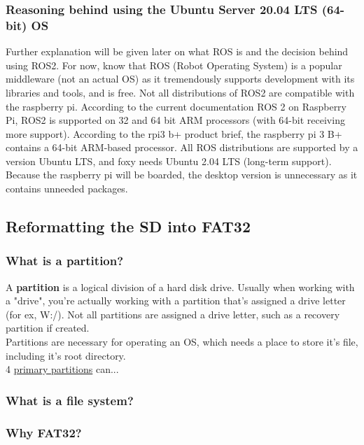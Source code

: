 \documentclass[a4paper, 10pt]{article}
\begin{document}
        \subsubsection{Reasoning behind using the Ubuntu Server 20.04 LTS (64-bit) OS}
            Further explanation will be given later on what ROS is and the decision behind using ROS2. For now, know that ROS (Robot Operating System) is a popular middleware (not an actual OS) as it tremendously supports development with its libraries and tools, and is free.
            Not all distributions of ROS2 are compatible with the raspberry pi. According to the current documentation ROS 2 on Raspberry Pi, ROS2 is supported on 32 and 64 bit ARM processors (with 64-bit receiving more support). According to the rpi3 b+ product brief, the raspberry pi 3 B+ contains a 64-bit ARM-based processor.
            All ROS distributions are supported by a version Ubuntu LTS, and foxy needs Ubuntu 2.04 LTS (long-term support). Because the raspberry pi will be boarded, the desktop version is unnecessary as it contains unneeded packages. 

        \subsection{Reformatting the SD into FAT32}
            \subsubsection{What is a partition?}
                A \textbf{partition} is a logical division of a hard disk drive. Usually when working with a "drive", you're actually working with a partition that's assigned a drive letter (for ex, W:/). Not all partitions are assigned a drive letter, such as a recovery partition if created.\\

                Partitions are necessary for operating an OS, which needs a place to store it's file, including it's root directory.\\

                4 \underline{primary partitions} can...
                
            \subsubsection{What is a file system?}
            \subsubsection{Why FAT32?}
\end{document}
